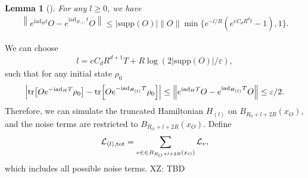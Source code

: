 \documentclass[11pt]{article}
\newtheorem{lemma}{Lemma}
\renewcommand{\i}{\mathrm{i}}
\renewcommand{\L}{\mathcal{L}}
\newcommand{\ad}{\mathrm{ad}}
\newcommand{\supp}{\mathrm{supp}}
\newcommand{\eps}{\varepsilon}
\newcommand{\xz}[1]{{\color{cyan} XZ: #1}}
\begin{document}
\begin{lemma}[{\cite[Lemma 2]{rao2025stability}}]
    For any $l\ge 0$, we have \begin{align*}
        \left\| e^{\i \ad_H t}O - e^{\i \ad_{H_{(l)}}t}O\right\| \le |\supp(O)|\|O\|\min\{e^{-l/R}(e^{eC_dR^d t}-1), 1\}.
    \end{align*}
\end{lemma}
We can choose \begin{align*}
    l = eC_d R^{d+1}T+ R\log(2|\supp(O)|/\eps),
\end{align*}
such that for any initial state $\rho_0$ \begin{align*}
    \left| \tr[Oe^{-\i \ad_H T}\rho_0]- \tr[Oe^{-\i \ad_{H_{(l)}} T}\rho_0]\right| \le \left\| e^{\i \ad_HT}O - e^{\i \ad_{H_{(l)}}T}O\right\| \le \eps/2.
\end{align*}
Therefore, we can simulate the truncated Hamiltonian $H_{(l)}$ on $B_{R_0+l+2R}(x_O)$,  and the noise terms are restricted to $B_{R_O+l+2R}(x_O)$. Define
\begin{align*}
     \L_{(l), \rm tot} =  \sum_{v\in \in B_{R_O+l+2R}(x_O)} \L_v,
\end{align*}
which includes all possible  noise terms. 
\xz{TBD}


\end{document}
